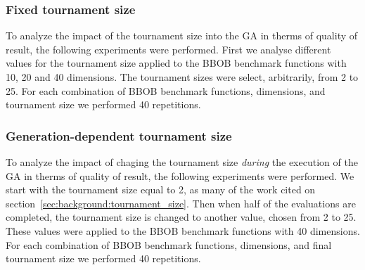 \subsubsection*{Fixed tournament size}

To analyze the impact of the tournament size into the GA in therms of quality of result, the following experiments were performed. First we analyse different values for the tournament size applied to the BBOB benchmark functions with 10, 20 and 40 dimensions. The tournament sizes were select, arbitrarily, from 2 to 25. For each combination of BBOB benchmark functions, dimensions, and tournament size we performed 40 repetitions.


\subsubsection*{Generation-dependent tournament size}

To analyze the impact of chaging the tournament size \textit{during} the execution of the GA in therms of quality of result, the following experiments were performed. We start with the tournament size equal to 2, as many of the work cited on section~\ref{sec:background:tournament_size}. Then when half of the evaluations are completed, the tournament size is changed to another value, chosen from 2 to 25. These values were applied to the BBOB benchmark functions with 40 dimensions. For each combination of BBOB benchmark functions, dimensions, and final tournament size we performed 40 repetitions.


